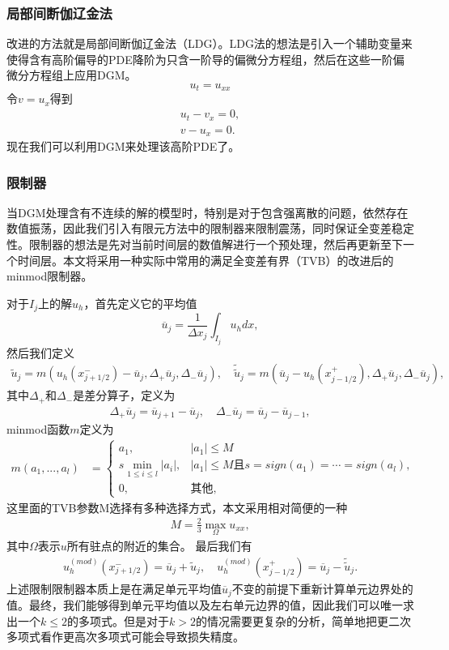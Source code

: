 \subsubsection{局部间断伽辽金法}
改进的方法就是局部间断伽辽金法（LDG）。LDG法的想法是引入一个辅助变量来使得含有高阶偏导的PDE降阶为只含一阶导的偏微分方程组，然后在这些一阶偏微分方程组上应用DGM。
\begin{equation}
    u_t = u_{xx}
\end{equation}
令$v = u_x$得到
\begin{align}
    u_t - v_x = 0, \\
    v - u_x = 0.
\end{align}
现在我们可以利用DGM来处理该高阶PDE了。
\subsubsection{限制器}
当DGM处理含有不连续的解的模型时，特别是对于包含强离散的问题，依然存在数值振荡，因此我们引入有限元方法中的限制器来限制震荡，同时保证全变差稳定性。限制器的想法是先对当前时间层的数值解进行一个预处理，然后再更新至下一个时间层。本文将采用一种实际中常用的满足全变差有界（TVB）的改进后的minmod限制器\cite{cockburn1989tvb2}。

对于$I_j$上的解$u_h$，首先定义它的平均值
$$
    \overline{u}_j = \frac{1}{\Delta x_j}\int_{I_j}u_h dx,
$$
然后我们定义
\begin{align}
    \tilde{u}_j = m(u_h(x^-_{j+1/2})-\overline{u}_j, \Delta_+\overline{u}_j, \Delta_-\overline{u}_j), \quad \tilde{\tilde{u}}_j = m(\overline{u}_j-u_h(x^+_{j-1/2}), \Delta_+\overline{u}_j, \Delta_-\overline{u}_j),
\end{align}
其中$\Delta_+$和$\Delta_-$是差分算子，定义为
\begin{align}
    \Delta_+\overline{u}_j = \overline{u}_{j+1}-\overline{u}_{j}, \quad \Delta_-\overline{u}_j = \overline{u}_{j}-\overline{u}_{j-1},
\end{align}
minmod函数$m$定义为
\begin{align}
    m(a_1, ..., a_l) & =
    \begin{cases}
        a_1,                         & |a_1| \leq M                                              \\
        s \min_{1\leq i\leq l}|a_i|, & |a_1| \leq M \text{且}s = sign(a_1) = \cdots = sign(a_l), \\
        0 ,                          & \text{其他},
    \end{cases}
\end{align}
这里面的TVB参数M选择有多种选择方式，本文采用相对简便的一种\cite{cockburn1989tvb3}
\begin{align}
    M = \frac{2}{3}\max_{\Omega}u_{xx},
\end{align}
其中$\Omega$表示$u$所有驻点的附近的集合。
最后我们有
\begin{align}
    u^{(mod)}_h(x^-_{j+1/2}) = \overline{u}_j + \tilde{u}_j, \quad u^{(mod)}_h(x^+_{j-1/2}) = \overline{u}_j - \tilde{\tilde{u}}_j.
\end{align}
上述限制限制器本质上是在满足单元平均值$\overline{u}_j$不变的前提下重新计算单元边界处的值。最终，我们能够得到单元平均值以及左右单元边界的值，因此我们可以唯一求出一个$k\leq 2$的多项式。但是对于$k> 2$的情况需要更复杂的分析，简单地把更二次多项式看作更高次多项式可能会导致损失精度。
